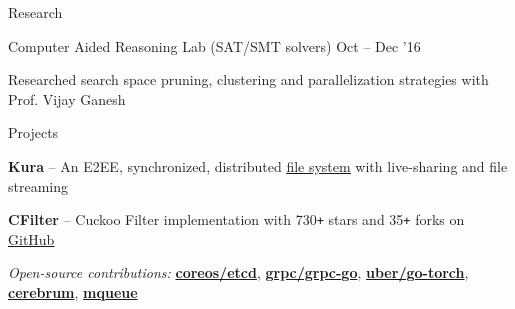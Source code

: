 \documentclass{resume} %
\begin{document}
\begin{rSection}{Research}
  \begin{rResearchSection}{Computer Aided Reasoning Lab}
                     {(SAT/SMT solvers)}
                     {Oct -- Dec '16}
   \item Researched search space pruning, clustering and
     parallelization strategies with Prof. Vijay Ganesh
  \end{rResearchSection}
\end{rSection}


\begin{rSection}{Projects}
  \begin{rProjectSection}
    \item \textbf {Kura} -- An E2EE, synchronized, distributed
      \href{https://github.com/kurafs/kura}{\underline{file system}} with
      live-sharing and file streaming
    \item \textbf {CFilter} -- Cuckoo Filter implementation with 730\texttt{+}
      stars and 35\texttt{+} forks on
      \href{https://github.com/irfansharif/cfilter}{\underline {GitHub}}
  \end{rProjectSection}

  \begin{rBlurbSection}
    \item {\em Open-source contributions:}
      \href{https://github.com/coreos/etcd/pull/8288}{\textbf{coreos/etcd}},
      \href{https://github.com/grpc/grpc-go/pull/1478}{\textbf{grpc/grpc-go}},
      \href{https://github.com/uber/go-torch/pull/62}{\textbf{uber/go-torch}},
      \href{https://rubygems.org/gems/cerebrum}{\textbf{cerebrum}},
      \href{https://rubygems.org/gems/mqueue}{\textbf{mqueue}}
  \end{rBlurbSection}
\end{rSection}
\end{document}
